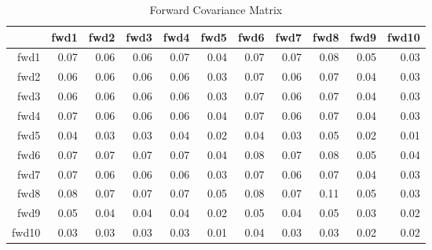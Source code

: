 \documentclass{article}
\begin{document}
\begin{enumerate}
    \begin{table}[ht]
    \centering
    \begin{tabular}{rrrrrrrrrrr}
    \hline
& fwd1 & fwd2 & fwd3 & fwd4 & fwd5 & fwd6 & fwd7 & fwd8 & fwd9 & fwd10 \\ 
    \hline
fwd1 & 0.07 & 0.06 & 0.06 & 0.07 & 0.04 & 0.07 & 0.07 & 0.08 & 0.05 & 0.03 \\ 
  fwd2 & 0.06 & 0.06 & 0.06 & 0.06 & 0.03 & 0.07 & 0.06 & 0.07 & 0.04 & 0.03 \\ 
  fwd3 & 0.06 & 0.06 & 0.06 & 0.06 & 0.03 & 0.07 & 0.06 & 0.07 & 0.04 & 0.03 \\ 
  fwd4 & 0.07 & 0.06 & 0.06 & 0.06 & 0.04 & 0.07 & 0.06 & 0.07 & 0.04 & 0.03 \\ 
  fwd5 & 0.04 & 0.03 & 0.03 & 0.04 & 0.02 & 0.04 & 0.03 & 0.05 & 0.02 & 0.01 \\ 
  fwd6 & 0.07 & 0.07 & 0.07 & 0.07 & 0.04 & 0.08 & 0.07 & 0.08 & 0.05 & 0.04 \\ 
  fwd7 & 0.07 & 0.06 & 0.06 & 0.06 & 0.03 & 0.07 & 0.06 & 0.07 & 0.04 & 0.03 \\ 
  fwd8 & 0.08 & 0.07 & 0.07 & 0.07 & 0.05 & 0.08 & 0.07 & 0.11 & 0.05 & 0.03 \\ 
  fwd9 & 0.05 & 0.04 & 0.04 & 0.04 & 0.02 & 0.05 & 0.04 & 0.05 & 0.03 & 0.02 \\ 
  fwd10 & 0.03 & 0.03 & 0.03 & 0.03 & 0.01 & 0.04 & 0.03 & 0.03 & 0.02 & 0.02 \\ 
   \hline
\end{tabular}
\caption{Forward Covariance Matrix}
\end{table}
\label{6}


\end{enumerate}
\end{document}
